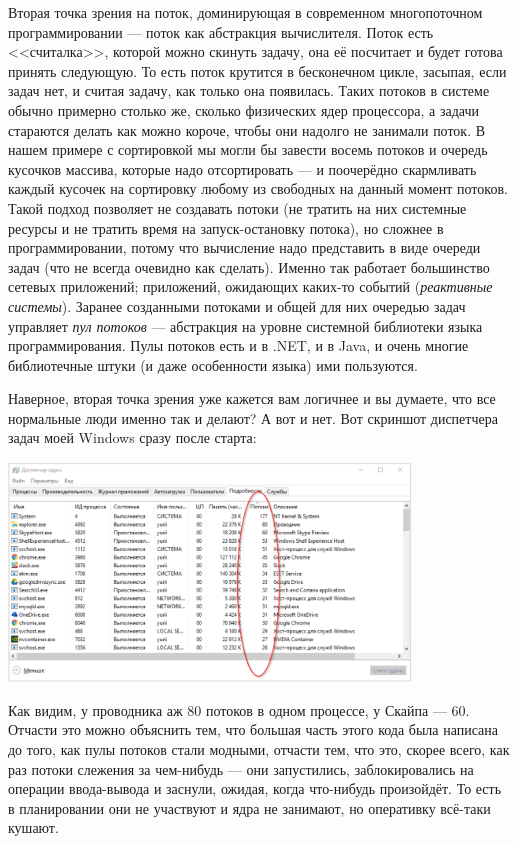 \documentclass[a5paper]{article}
\begin{document}
Вторая точка зрения на поток, доминирующая в современном многопоточном программировании --- поток как абстракция вычислителя. Поток есть <<считалка>>, которой можно скинуть задачу, она её посчитает и будет готова принять следующую. То есть поток крутится в бесконечном цикле, засыпая, если задач нет, и считая задачу, как только она появилась. Таких потоков в системе обычно примерно столько же, сколько физических ядер процессора, а задачи стараются делать как можно короче, чтобы они надолго не занимали поток. В нашем примере с сортировкой мы могли бы завести восемь потоков и очередь кусочков массива, которые надо отсортировать --- и поочерёдно скармливать каждый кусочек на сортировку любому из свободных на данный момент потоков. Такой подход позволяет не создавать потоки (не тратить на них системные ресурсы и не тратить время на запуск-остановку потока), но сложнее в программировании, потому что вычисление надо представить в виде очереди задач (что не всегда очевидно как сделать). Именно так работает большинство сетевых приложений; приложений, ожидающих каких-то событий (\textit{реактивные системы}). Заранее созданными потоками и общей для них очередью задач управляет \textit{пул потоков} --- абстракция на уровне системной библиотеки языка программирования. Пулы потоков есть и в .NET, и в Java, и очень многие библиотечные штуки (и даже особенности языка) ими пользуются.

Наверное, вторая точка зрения уже кажется вам логичнее и вы думаете, что все нормальные люди именно так и делают? А вот и нет. Вот скриншот диспетчера задач моей Windows сразу после старта:

\begin{center}
    \includegraphics[width=0.8\textwidth]{threadsEverywhere.png}
\end{center}

Как видим, у проводника аж 80 потоков в одном процессе, у Скайпа --- 60. Отчасти это можно объяснить тем, что большая часть этого кода была написана до того, как пулы потоков стали модными, отчасти тем, что это, скорее всего, как раз потоки слежения за чем-нибудь --- они запустились, заблокировались на операции ввода-вывода и заснули, ожидая, когда что-нибудь произойдёт. То есть в планировании они не участвуют и ядра не занимают, но оперативку всё-таки кушают.
\end{document}
